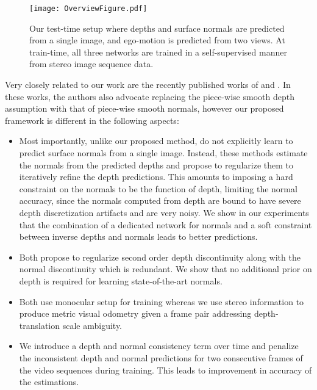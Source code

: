 \documentclass[letterpaper, 10 pt, conference]{ieeeconf}
\begin{document}
\begin{figure}[!t] 
\centering
\texttt{[image: OverviewFigure.pdf]}
\caption{Our test-time setup where depths and surface normals are predicted from a single image, and ego-motion is predicted from two views. At train-time, all three networks are trained in a self-supervised manner from stereo image sequence data. \vspace{-5mm}}
\label{fig:testOverview}
\end{figure}

Very closely related to our work are the recently published works of \cite{yang2017depthnormal} and \cite{yang2018lego}. In these works, the authors also advocate replacing the piece-wise smooth depth assumption with that of piece-wise smooth normals, however our proposed framework is different in the following aspects:
\begin{itemize}
    \item Most importantly, unlike our proposed method, \cite{yang2017depthnormal,yang2018lego} do not explicitly learn to predict surface normals from a single image. Instead, these methods estimate the normals from the predicted depths and propose to regularize them to iteratively refine the depth predictions. This amounts to imposing a hard constraint on the normals to be the function of depth, limiting the normal accuracy, since the normals computed from depth are bound to have severe depth discretization artifacts and are very noisy. We show in our experiments that the combination of a dedicated network for normals and a soft constraint between inverse depths and normals leads to better predictions.
    \item Both \cite{yang2017depthnormal,yang2018lego} propose to regularize second order depth discontinuity along with the normal discontinuity which is redundant. We show that no additional prior on depth is required for learning state-of-the-art normals.
    \item Both \cite{yang2017depthnormal,yang2018lego} use monocular setup for training whereas we use stereo information to produce metric visual odometry given a frame pair addressing depth-translation scale ambiguity.
    \item We introduce a depth and normal consistency term over time and penalize the inconsistent depth and normal predictions for two consecutive frames of the video sequences during training. This leads to improvement in accuracy of the estimations.
\end{itemize}
\end{document}
